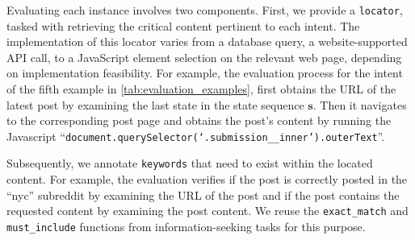 Evaluating each instance involves two components. First, we provide a \texttt{locator}, tasked with retrieving the critical content pertinent to each intent. 
The implementation of this locator varies from a database query, a website-supported API call, to a JavaScript element selection on the relevant web page, depending on implementation feasibility.
For example, the evaluation process for the intent of the fifth example in \autoref{tab:evaluation_examples}, first obtains the URL of the latest post by examining the last state in the state sequence $\mathbf{s}$. Then it navigates to the corresponding post page and obtains the post's content by running the Javascript {\small ``\texttt{document.querySelector(`.submission\_\_inner').outerText}''}.

Subsequently, we annotate \texttt{keywords} that need to exist within the located content. For example, the evaluation verifies if the post is correctly posted in the ``nyc'' subreddit by examining the URL of the post and if the post contains the requested content by examining the post content.
We reuse the \texttt{exact\_match} and \texttt{must\_include} functions from information-seeking tasks for this purpose.

